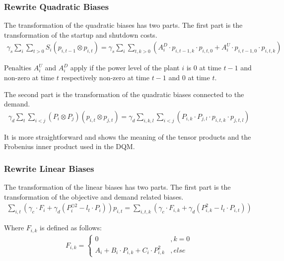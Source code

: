 \subsubsection{Rewrite Quadratic Biases}

The transformation of the quadratic biases has two parts.
The first part is the transformation of the startup and shutdown costs.
\begin{align}
  \gamma_s \sum_i \sum_{t > 0} S_i \left( p_{i, t-1} \otimes p_{i, t} \right)
  = \gamma_s \sum_i \sum_{t, k > 0} \left(
    A_i^D \cdot p_{i, t-1, k} \cdot p_{i, t, 0}
    + A_i^U \cdot p_{i, t-1, 0} \cdot p_{i, t, k}
  \right)
\end{align}

Penalties $A_i^U$ and $A_i^D$ apply if the power level of the plant $i$ is $0$ at time $t-1$ and non-zero at time $t$ respectively non-zero at time $t-1$ and $0$ at time $t$.

The second part is the transformation of the quadratic biases connected to the demand.
\begin{align}
  \gamma_d \sum_t \sum_{i < j} \left( P_i \otimes P_j \right) \left( p_{i, t} \otimes p_{j, t} \right)
  = \gamma_d \sum_{i, k, l} \sum_{i < j} \left( P_{i,k} \cdot P_{j,l} \cdot p_{i, t, k} \cdot p_{j, t, l} \right)
\end{align}

It is more straightforward and shows the meaning of the tensor products and the Frobenius inner product used in the DQM.

\subsubsection{Rewrite Linear Biases}

The transformation of the linear biases has two parts.
The first part is the transformation of the objective and demand related biases.
\begin{align}
  \sum_{i, t} \left(
    \gamma_c \cdot F_i + \gamma_d \left( P_i^{\odot 2} - l_t \cdot P_i \right)
  \right) p_{i, t}
  =
  \sum_{i, t, k} \left(
    \gamma_c \cdot F_{i, k} + \gamma_d \left( P_{i, k}^2 - l_t \cdot P_{i, t} \right)
  \right)
\end{align}

Where $F_{i, k}$ is defined as follows:
\begin{align}
  F_{i, k} = \begin{cases}
    0 & , k = 0 \\
    A_i + B_i \cdot P_{i, k} + C_i \cdot P_{i, k}^2 & , else
  \end{cases}
\end{align}

